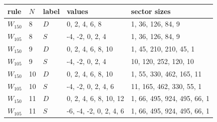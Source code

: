 \setlength{\tabcolsep}{4pt}
\begin{tabular}{llll l}
\toprule
rule & $N$ & label & values & sector sizes \\
\midrule
$W_{150}$ & 8 & $D$ & 0, 2, 4, 6, 8 & 1, 36, 126, 84, 9 \\
$W_{105}$ & 8 & $S$ & -4, -2, 0, 2, 4 & 1, 36, 126, 84, 9 \\
\addlinespace
$W_{150}$ & 9 & $D$ & 0, 2, 4, 6, 8, 10 & 1, 45, 210, 210, 45, 1 \\
$W_{105}$ & 9 & $S$ & -4, -2, 0, 2, 4 & 10, 120, 252, 120, 10 \\
\addlinespace
$W_{150}$ & 10 & $D$ & 0, 2, 4, 6, 8, 10 & 1, 55, 330, 462, 165, 11 \\
$W_{105}$ & 10 & $S$ & -4, -2, 0, 2, 4, 6 & 11, 165, 462, 330, 55, 1 \\
\addlinespace
$W_{150}$ & 11 & $D$ & 0, 2, 4, 6, 8, 10, 12 & 1, 66, 495, 924, 495, 66, 1 \\
$W_{105}$ & 11 & $S$ & -6, -4, -2, 0, 2, 4, 6 & 1, 66, 495, 924, 495, 66, 1 \\
\bottomrule
\end{tabular}
